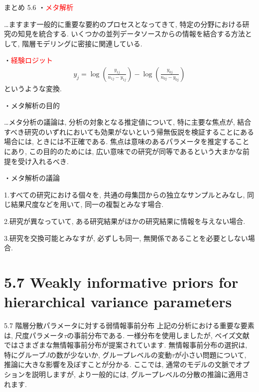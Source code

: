 \documentclass[10pt,dvipdfmx,a4]{beamer}
\newcommand{\eqn}[1]{\begin{align*}#1\end{align*}}
\newcommand{\tcr}[1]{\textcolor{red}{#1}}
\begin{document}

\begin{frame}[t]{まとめ 5.6}
・\tcr{メタ解析}

…ますます一般的に重要な要約のプロセスとなってきて, 特定の分野における研究の知見を統合する.
いくつかの並列データソースからの情報を結合する方法として, 階層モデリングに密接に関連している.

・\tcr{経験ロジット}
\eqn{y_j=\log \left(\tfrac{y_{1j}}{n_{1j}-y_{1j}}\right)-\log \left(\tfrac{y_{0j}}{n_{0j}-y_{0j}}\right)}
というような変換.

・メタ解析の目的

…メタ分析の議論は, 分析の対象となる推定値について, 特に主要な焦点が, 結合すべき研究のいずれにおいても効果がないという帰無仮説を検証することにある場合には, ときには不正確である.
焦点は意味のあるパラメータを推定することにあり, この目的のためには, 広い意味での研究が同等であるという大まかな前提を受け入れるべき.
\end{frame}


\begin{frame}[t]
・メタ解析の議論

1.すべての研究における個々を, 共通の母集団からの独立なサンプルとみなし, 同じ結果尺度などを用いて, 同一の複製とみなす場合.

2.研究が異なっていて, ある研究結果がほかの研究結果に情報を与えない場合.

3.研究を交換可能とみなすが, 必ずしも同一, 無関係であることを必要としない場合.

\end{frame}

\section{5.7 Weakly informative priors for hierarchical variance parameters}
\begin{frame}{5.7 階層分散パラメータに対する弱情報事前分布}
上記の分析における重要な要素は, 尺度パラメータ$\tau$の事前分布である.
一様分布を使用しましたが, ベイズ文献ではさまざまな無情報事前分布が提案されています.
無情報事前分布の選択は, 特にグループ$J$の数が少ないか, グループレベルの変動$\tau$が小さい問題について, 推論に大きな影響を及ぼすことが分かる.
ここでは, 通常のモデルの文脈でオプションを説明しますが, より一般的には, グループレベルの分散の推論に適用されます.
\end{frame}
\end{document}
